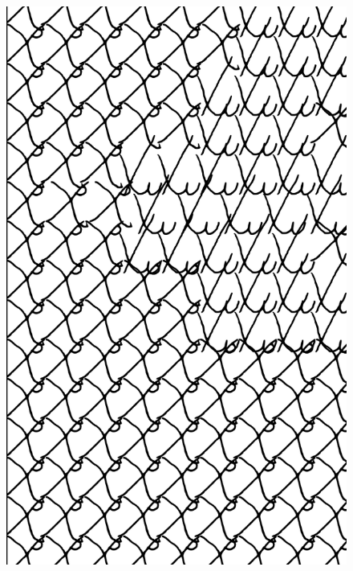 \makeatletter\@openrightfalse
\movetooddpage
\begin{absolutelynopagebreak}
\begin{vplace}
\begin{figure}[H]
\begin{adjustwidth}{-0.99cm}{}
  \centering
  \vspace*{-1.97cm}
  \hspace*{-0.70cm}
  \includegraphics[width=115mm]{./imgs/img4.pdf}  
  \hfill
\end{adjustwidth}

\thispagestyle{empty}

\end{figure}
\end{vplace}

\end{absolutelynopagebreak}

